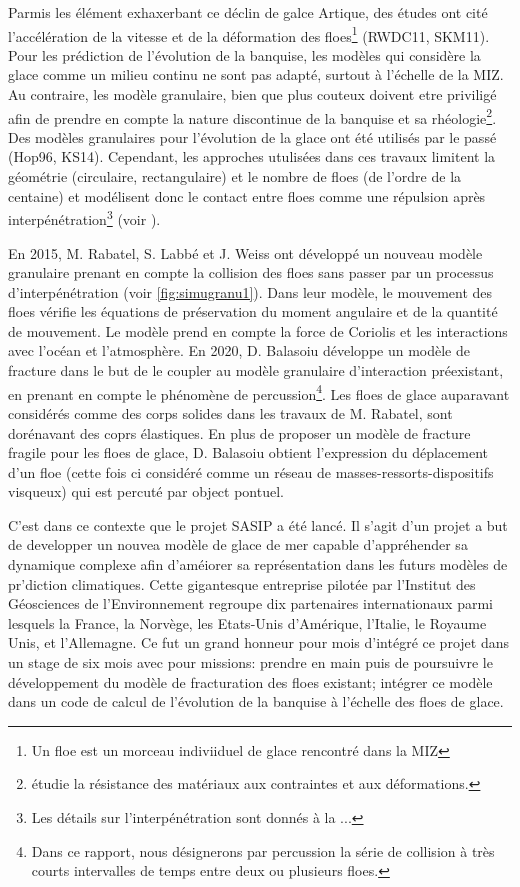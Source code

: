 Parmis les élément exhaxerbant ce déclin de galce Artique, des études ont cité l'accélération de la vitesse et de la déformation des floes\footnote{Un floe est un morceau indiviiduel de glace rencontré dans la MIZ} (RWDC11, SKM11). Pour les prédiction de l'évolution de la banquise, les modèles qui considère la glace comme un milieu continu ne sont pas adapté, surtout à l'échelle de la MIZ. Au contraire, les modèle granulaire, bien que plus couteux doivent etre priviligé afin de prendre en compte la nature discontinue de la banquise et sa rhéologie\footnote{étudie la résistance des matériaux aux contraintes et aux déformations.}. Des modèles granulaires pour l'évolution de la glace ont été utilisés par le passé (Hop96, KS14). Cependant, les approches utulisées dans ces travaux limitent la géométrie (circulaire, rectangulaire) et le nombre de floes (de l'ordre de la centaine) et modélisent donc le contact entre floes comme une répulsion après interpénétration\footnote{Les détails sur l'interpénétration sont donnés à la ... } (voir \parencite[p.16]{balasoiu2020halthesis}). 

En 2015, M. Rabatel, S. Labbé et J. Weiss \parencite{rabatel2015dynamics,rabatel2015thesis} ont développé un nouveau modèle granulaire prenant en compte la collision des floes sans passer par un processus d’interpénétration (voir \cref{fig:simugranu1}). Dans leur modèle, le mouvement des floes vérifie les équations de préservation du moment angulaire et de la quantité de mouvement. Le modèle prend en compte la force de Coriolis et les interactions avec l’océan et l’atmosphère. En 2020, D. Balasoiu \parencite{balasoiu2020halthesis} développe un modèle de fracture dans le but de le coupler au modèle granulaire d'interaction préexistant, en prenant en compte le phénomène de percussion\footnote{Dans ce rapport, nous désignerons par percussion la série de collision à très courts intervalles de temps entre deux ou plusieurs floes.}. Les floes de glace auparavant considérés comme des corps solides dans les travaux de M. Rabatel, sont dorénavant des coprs élastiques. En plus de proposer un modèle de fracture fragile pour les floes de glace, D. Balasoiu obtient l’expression du déplacement d'un floe (cette fois ci considéré comme un réseau de masses-ressorts-dispositifs visqueux) qui est percuté par object pontuel.

C'est dans ce contexte que le projet SASIP a été lancé. Il s'agit d'un projet a but de developper un nouvea modèle de glace de mer capable d'appréhender sa dynamique complexe afin d'améiorer sa représentation dans les futurs modèles de pr'diction climatiques. Cette gigantesque entreprise pilotée par l'Institut des Géosciences de l'Environnement regroupe dix partenaires internationaux parmi lesquels la France, la Norvège, les Etats-Unis d'Amérique, l'Italie, le Royaume Unis, et l'Allemagne. Ce fut un grand honneur pour mois d'intégré ce projet dans un stage de six mois avec pour missions: prendre en main puis de poursuivre le développement du modèle de fracturation des floes existant; intégrer ce modèle dans un code de calcul de l’évolution de la banquise à l’échelle des floes de glace.


